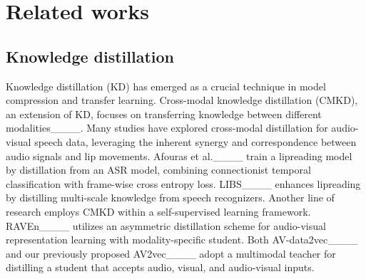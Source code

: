 \section{Related works}
\subsection{Knowledge distillation}
Knowledge distillation (KD) has emerged as a crucial technique in model compression and transfer learning.
Cross-modal knowledge distillation (CMKD), an extension of KD, focuses on transferring knowledge between different modalities____.
Many studies have explored cross-modal distillation for audio-visual speech data, leveraging the inherent synergy and correspondence between audio signals and lip movements. 
Afouras et al.____ train a lipreading model by distillation from an ASR model, combining connectionist temporal classification with frame-wise cross entropy loss. 
LIBS____ enhances lipreading by distilling multi-scale knowledge from speech recognizers. 
Another line of research employs CMKD within a self-supervised learning framework. 
RAVEn____ utilizes an asymmetric distillation scheme for audio-visual representation learning with modality-specific student. 
Both AV-data2vec____ and our previously proposed AV2vec____ adopt a multimodal teacher for distilling a student that accepts audio, visual, and audio-visual inputs.

